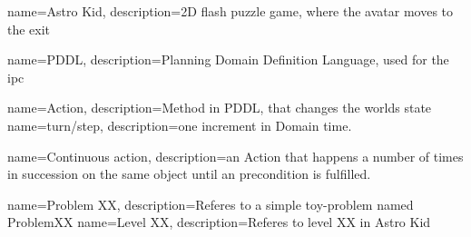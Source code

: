 \makeglossaries

{
	name={Astro Kid},
	description={2D flash puzzle game, where the avatar moves to the exit }
}

{
	name={PDDL},
	description={Planning Domain Definition Language, used for the \acrshort{ipc}}
}

{
	name={Action},
	description={Method in PDDL, that changes the worlds state}
}
{
	name={turn/step},
	description={one increment in Domain time.}
} 
 
 {
 	name={Continuous action},
 	description={an Action that happens a number of times in succession on the same object until an precondition is fulfilled.}
 }
 
  {
  	name={Problem XX},
  	description={Referes to a simple toy-problem named ProblemXX}
  }
   {
   	name={Level XX},
   	description={Referes to level XX in Astro Kid}
   }

